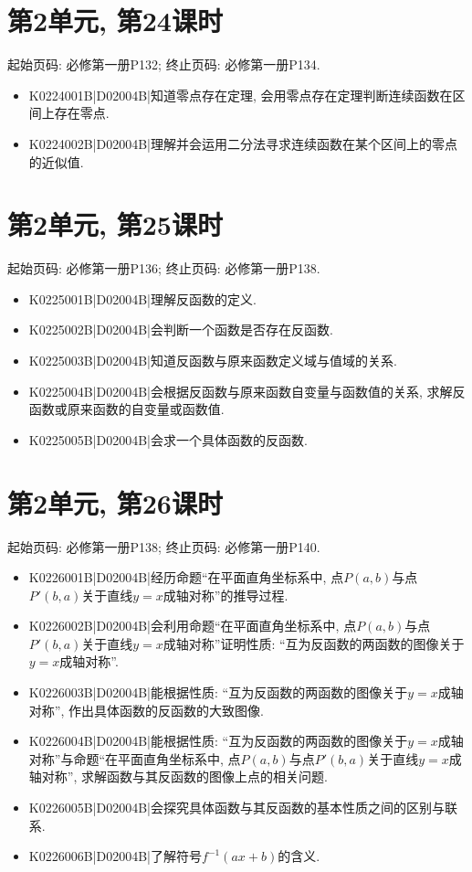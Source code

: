 \section*{第2单元, 第24课时}
起始页码: 必修第一册P132; 终止页码: 必修第一册P134.
\begin{itemize}
\item K0224001B|D02004B|知道零点存在定理, 会用零点存在定理判断连续函数在区间上存在零点.
\item K0224002B|D02004B|理解并会运用二分法寻求连续函数在某个区间上的零点的近似值.
\end{itemize}

\section*{第2单元, 第25课时}
起始页码: 必修第一册P136; 终止页码: 必修第一册P138.
\begin{itemize}
\item K0225001B|D02004B|理解反函数的定义.
\item K0225002B|D02004B|会判断一个函数是否存在反函数.
\item K0225003B|D02004B|知道反函数与原来函数定义域与值域的关系.
\item K0225004B|D02004B|会根据反函数与原来函数自变量与函数值的关系, 求解反函数或原来函数的自变量或函数值.
\item K0225005B|D02004B|会求一个具体函数的反函数.
\end{itemize}

\section*{第2单元, 第26课时}
起始页码: 必修第一册P138; 终止页码: 必修第一册P140.
\begin{itemize}
\item K0226001B|D02004B|经历命题``在平面直角坐标系中, 点$P(a,b)$与点$P'(b,a)$关于直线$y=x$成轴对称''的推导过程.
\item K0226002B|D02004B|会利用命题``在平面直角坐标系中, 点$P(a,b)$与点$P'(b,a)$关于直线$y=x$成轴对称''证明性质: ``互为反函数的两函数的图像关于$y=x$成轴对称''.
\item K0226003B|D02004B|能根据性质: ``互为反函数的两函数的图像关于$y=x$成轴对称'', 作出具体函数的反函数的大致图像.
\item K0226004B|D02004B|能根据性质: ``互为反函数的两函数的图像关于$y=x$成轴对称''与命题``在平面直角坐标系中, 点$P(a,b)$与点$P'(b,a)$关于直线$y=x$成轴对称'', 求解函数与其反函数的图像上点的相关问题.
\item K0226005B|D02004B|会探究具体函数与其反函数的基本性质之间的区别与联系.
\item K0226006B|D02004B|了解符号$f^{-1}(ax+b)$的含义.
\end{itemize}

